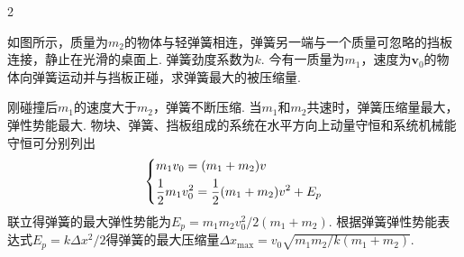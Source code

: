 \begin{paracol}{2}
\begin{problem}
    如图所示，质量为$m_2$的物体与轻弹簧相连，弹簧另一端与一个质量可忽略的挡板连接，静止在光滑的桌面上. 弹簧劲度系数为$k$. 今有一质量为$m_1$，速度为$\bm v_0$的物体向弹簧运动并与挡板正碰，求弹簧最大的被压缩量.
    \switchcolumn\vspace*{\fill}\centering
    \vspace*{\fill}
\end{problem}
\end{paracol}
\begin{solution}
    刚碰撞后$m_1$的速度大于$m_2$，弹簧不断压缩. 当$m_1$和$m_2$共速时，弹簧压缩量最大，弹性势能最大. 物块、弹簧、挡板组成的系统在水平方向上动量守恒和系统机械能守恒可分别列出
    \[\begin{dcases}
        m_1v_0=(m_1+m_2)v\\
        \frac12m_1v_0^2=\frac12(m_1+m_2)v^2+E_p
    \end{dcases}\]
    联立得弹簧的最大弹性势能为$E_p=m_1m_2v_0^2/2(m_1+m_2)$. 根据弹簧弹性势能表达式$E_p=k\Delta x^2/2$得弹簧的最大压缩量$\Delta x_{\max}=v_0\sqrt{m_1m_2/k(m_1+m_2)}$.
\end{solution}

